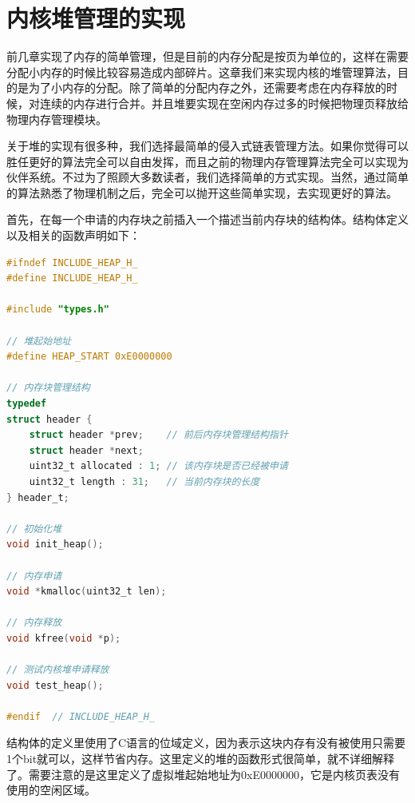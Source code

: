
\section {内核堆管理的实现}

\par 前几章实现了内存的简单管理，但是目前的内存分配是按页为单位的，这样在需要分配小内存的时候比较容易造成内部碎片。这章我们来实现内核的堆管理算法，目的是为了小内存的分配。除了简单的分配内存之外，还需要考虑在内存释放的时候，对连续的内存进行合并。并且堆要实现在空闲内存过多的时候把物理页释放给物理内存管理模块。

\par 关于堆的实现有很多种，我们选择最简单的侵入式链表管理方法。如果你觉得可以胜任更好的算法完全可以自由发挥，而且之前的物理内存管理算法完全可以实现为伙伴系统。不过为了照顾大多数读者，我们选择简单的方式实现。当然，通过简单的算法熟悉了物理机制之后，完全可以抛开这些简单实现，去实现更好的算法。

\par 首先，在每一个申请的内存块之前插入一个描述当前内存块的结构体。结构体定义以及相关的函数声明如下：

\begin{lstlisting}[language = C, caption = include/heap.h]
#ifndef INCLUDE_HEAP_H_
#define INCLUDE_HEAP_H_

#include "types.h"

// 堆起始地址
#define HEAP_START 0xE0000000

// 内存块管理结构
typedef
struct header {
	struct header *prev; 	// 前后内存块管理结构指针
	struct header *next;
	uint32_t allocated : 1;	// 该内存块是否已经被申请
	uint32_t length : 31; 	// 当前内存块的长度
} header_t;

// 初始化堆
void init_heap();

// 内存申请
void *kmalloc(uint32_t len);

// 内存释放
void kfree(void *p);

// 测试内核堆申请释放
void test_heap();

#endif 	// INCLUDE_HEAP_H_
\end{lstlisting}

\par 结构体的定义里使用了C语言的位域定义，因为表示这块内存有没有被使用只需要1个bit就可以，这样节省内存。这里定义的堆的函数形式很简单，就不详细解释了。需要注意的是这里定义了虚拟堆起始地址为0xE0000000，它是内核页表没有使用的空闲区域。


